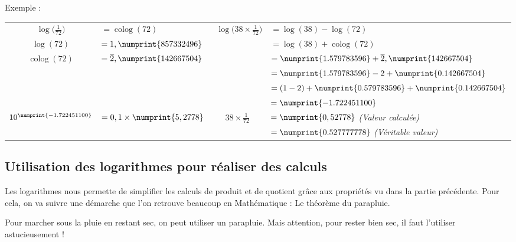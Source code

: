 \documentclass[a4paper]{article}
\begin{document}
\vspace{2 mm}

{ \parindent=0cm Exemple : }

\begin{tabular}{cl|cl}
	$\log \Big( \frac{1}{72} \Big) $ & $= \operatorname{colog} (72)$ & $~~\log \Big(38 \times \frac{1}{72} \Big)$ & $= \log(38) - \log(72)$\\
	
$ \log (72) $ & $= 1,\numprint{857 332 496}$ & & $= \log(38) + \operatorname{colog}(72)$ \\

$ \operatorname{colog} (72) $ & $= \overline{2},\numprint{142 667 504} $ & & $= \numprint{1.579 783 596} + \overline{2},\numprint{142 667 504}$\\

& & & $= \numprint{1.579 783 596} -2 + \numprint{0.142 667 504}$\\

& & & $= (1-2) + \numprint{0.579 783 596} + \numprint{0.142 667 504}$\\

&&& $= \numprint{-1.722451100}$\\

$10^{\numprint{-1.722451100}}$ & $= 0,1 \times \numprint{5,2778}$ & $38 \times \frac{1}{72}$ & $= \numprint{0,52778}$\phantom{$\numprint{7777}$} \textit{(Valeur calculée)}\\

&&& $= \numprint{0.527 777 778}$ \textit{(Véritable valeur)}\\

\end{tabular}





\pagebreak

\subsection{Utilisation des logarithmes pour réaliser des calculs}

Les logarithmes nous permette de simplifier les calculs de produit et de quotient grâce aux propriétés vu dans la partie précédente. Pour cela, on va suivre une démarche que l'on retrouve beaucoup en Mathématique : Le théorème du parapluie.

Pour marcher sous la pluie en restant sec, on peut utiliser un parapluie. Mais attention, pour rester bien sec, il faut l'utiliser astucieusement !
\end{document}
